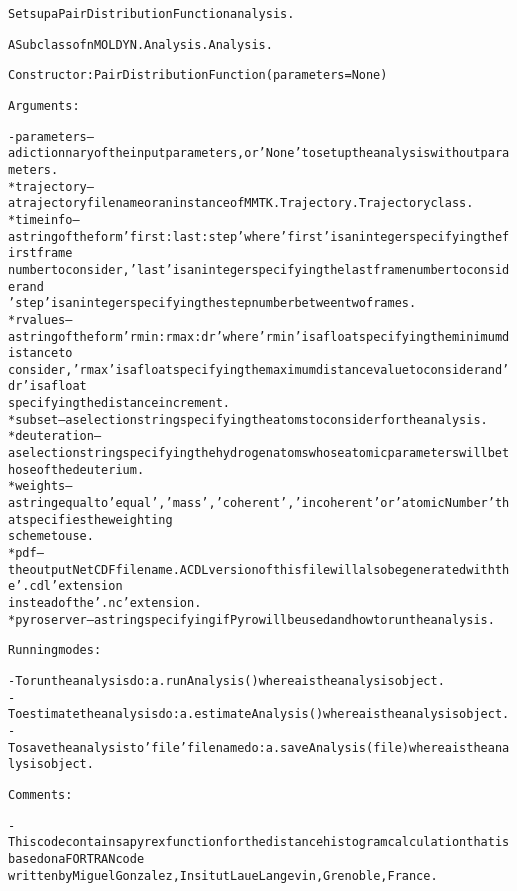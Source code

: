 \begin{alltt}
Sets up a Pair Distribution Function analysis.

A Subclass of nMOLDYN.Analysis.Analysis. 

Constructor: PairDistributionFunction({\textbar}parameters{\textbar} = None)

Arguments:

    - {\textbar}parameters{\textbar} -- a dictionnary of the input parameters, or 'None' to set up the analysis without parameters.
        * trajectory  -- a trajectory file name or an instance of MMTK.Trajectory.Trajectory class.
        * timeinfo    -- a string of the form 'first:last:step' where 'first' is an integer specifying the first frame 
                         number to consider, 'last' is an integer specifying the last frame number to consider and 
                         'step' is an integer specifying the step number between two frames.
        * rvalues     -- a string of the form 'rmin:rmax:dr' where 'rmin' is a float specifying the minimum distance to 
                         consider, 'rmax' is a float specifying the maximum distance value to consider and 'dr' is a float
                         specifying the distance increment. 
        * subset      -- a selection string specifying the atoms to consider for the analysis.
        * deuteration -- a selection string specifying the hydrogen atoms whose atomic parameters will be those of the deuterium.
        * weights     -- a string equal to 'equal', 'mass', 'coherent' , 'incoherent' or 'atomicNumber' that specifies the weighting
                         scheme to use.
        * pdf         -- the output NetCDF file name. A CDL version of this file will also be generated with the '.cdl' extension
                         instead of the '.nc' extension.
        * pyroserver  -- a string specifying if Pyro will be used and how to run the analysis.
    
Running modes:

    - To run the analysis do: a.runAnalysis() where a is the analysis object.
    - To estimate the analysis do: a.estimateAnalysis() where a is the analysis object.
    - To save the analysis to 'file' file name do: a.saveAnalysis(file) where a is the analysis object.

Comments:        
    
    - This code contains a pyrex function for the distance histogram calculation that is based on a FORTRAN code 
      written by Miguel Gonzalez, Insitut Laue Langevin, Grenoble, France.
\end{alltt}


